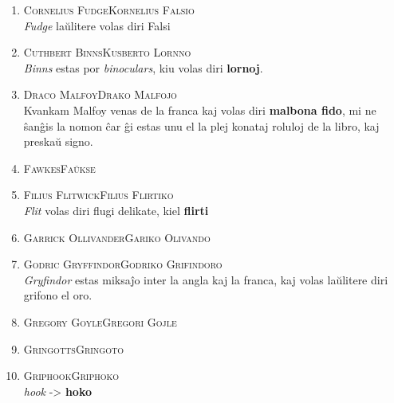 \begin{enumerate}
\item\label{nomoj:falsio} \textsc{Cornelius Fudge}\dotfill \textsc{Kornelius Falsio}\\
{\footnotesize \indent \emph{Fudge} laŭlitere volas diri Falsi}
\smallskip

\item\label{nomoj:lornno} \textsc{Cuthbert Binns}\dotfill \textsc{Kusberto Lornno}\\
{\footnotesize \indent \emph{Binns} estas por \emph{binoculars}, kiu volas diri \textbf{lornoj}.}
\smallskip

\item\label{nomoj:malfojo} \textsc{Draco Malfoy}\dotfill \textsc{Drako Malfojo}\\
{\footnotesize \indent Kvankam Malfoy venas de la franca kaj volas diri \textbf{malbona
fido}, mi ne ŝanĝis la nomon ĉar ĝi estas unu el la plej konataj
roluloj de la libro, kaj preskaŭ signo.}
\smallskip

\item\label{nomoj:faŭkse} \textsc{Fawkes}\dotfill \textsc{Faŭkse}\\
\item\label{nomoj:flirtiko} \textsc{Filius Flitwick}\dotfill \textsc{Filius Flirtiko}\\
{\footnotesize \indent \emph{Flit} volas diri flugi delikate, kiel \textbf{flirti}}
\smallskip

\item\label{nomoj:olivando} \textsc{Garrick Ollivander}\dotfill \textsc{Gariko Olivando}\\
\smallskip

\item\label{nomoj:grifindoro} \textsc{Godric Gryffindor}\dotfill \textsc{Godriko Grifindoro}\\
{\footnotesize \indent \emph{Gryfindor} estas miksaĵo inter la angla kaj la franca, kaj volas laŭlitere diri grifono el oro.}
\smallskip

\item\label{nomoj:gojle} \textsc{Gregory Goyle}\dotfill \textsc{Gregori Gojle}\\
\item\label{nomoj:gringoto} \textsc{Gringotts}\dotfill \textsc{Gringoto}\\
\item\label{nomoj:griphoko} \textsc{Griphook}\dotfill \textsc{Griphoko}\\
{\footnotesize \indent \emph{hook} -> \textbf{hoko}}
\smallskip


\end{enumerate}
